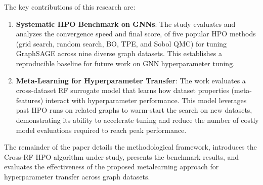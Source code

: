 The key contributions of this research are:
\begin{enumerate}
	\item \textbf{Systematic HPO Benchmark on GNNs}: The study evaluates and analyzes the convergence speed and final score, of five popular HPO methods (grid search, random search, BO, TPE, and Sobol QMC) for tuning GraphSAGE across nine diverse graph datasets. This establishes a reproducible baseline for future work on GNN hyperparameter tuning.
	\item \textbf{Meta-Learning for Hyperparameter Transfer}: The work evaluates a cross-dataset RF surrogate model that learns how dataset properties (meta-features) interact with hyperparameter performance. This model leverages past HPO runs on related graphs to warm-start the search on new datasets, demonstrating its ability to accelerate tuning and reduce the number of costly model evaluations required to reach peak performance.
\end{enumerate}

The remainder of the paper details the methodological framework, introduces the Cross-RF HPO algorithm under study, presents the benchmark results, and evaluates the effectiveness of the proposed metalearning approach for hyperparameter transfer across graph datasets.
